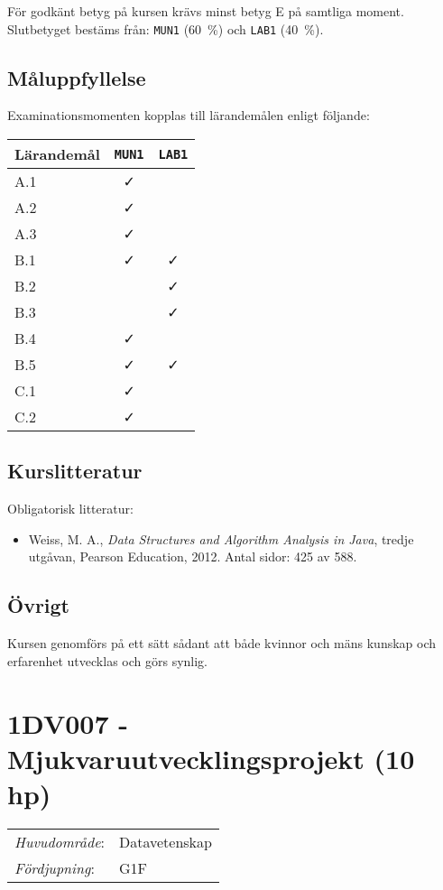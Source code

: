 För godkänt betyg på kursen krävs minst betyg E på samtliga moment.
Slutbetyget bestäms från: \texttt{MUN1} (60~\%) och \texttt{LAB1} (40~\%).

\subsection*{Måluppfyllelse}

Examinationsmomenten kopplas till lärandemålen enligt följande:

\begin{longtable}[]{@{}lcc@{}}
\toprule
\textsf{Lärandemål} & \texttt{MUN1} & \texttt{LAB1}\tabularnewline
\midrule
\endhead
A.1 & \faCheck &\tabularnewline
A.2 & \faCheck &\tabularnewline
A.3 & \faCheck &\tabularnewline
B.1 & \faCheck & \faCheck\tabularnewline
B.2 & & \faCheck\tabularnewline
B.3 & & \faCheck\tabularnewline
B.4 & \faCheck &\tabularnewline
B.5 & \faCheck & \faCheck\tabularnewline
C.1 & \faCheck &\tabularnewline
C.2 & \faCheck &\tabularnewline
\bottomrule
\end{longtable}

\subsection*{Kurslitteratur}

Obligatorisk litteratur:

\begin{itemize}
\tightlist
\item
  Weiss, M. A., \emph{Data Structures and Algorithm Analysis in Java},
  tredje utgåvan, Pearson Education, 2012. Antal sidor: 425 av 588.
\end{itemize}

\subsection*{Övrigt}

Kursen genomförs på ett sätt sådant att både kvinnor och mäns kunskap och erfarenhet utvecklas och görs synlig.
\pagebreak
\section*{1DV007 - Mjukvaruutvecklingsprojekt (10 hp)}

\begin{tabular}{ll}\emph{Huvudområde}: & Datavetenskap\tabularnewline\emph{Fördjupning}: & G1F\tabularnewline\end{tabular}

